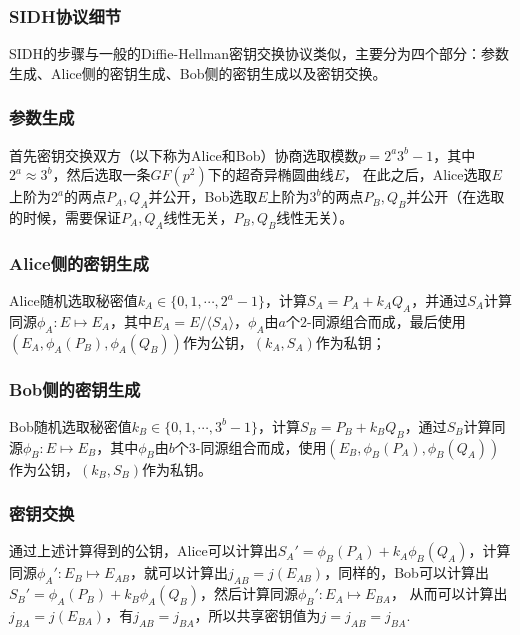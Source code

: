 \documentclass{book}
\numberwithin{equation}{subsubsection}
\begin{document}
\subsubsection{SIDH协议细节}
SIDH的步骤与一般的Diffie-Hellman密钥交换协议类似，主要分为四个部分：参数生成、Alice侧的密钥生成、Bob侧的密钥生成以及密钥交换。
\subsubsection*{参数生成}
首先密钥交换双方（以下称为Alice和Bob）协商选取模数$p=2^a3^b-1$，其中$2^a\approx 3^b$，然后选取一条$GF(p^2)$下的超奇异椭圆曲线$E$，
在此之后，Alice选取$E$上阶为$2^a$的两点$P_A,Q_A$并公开，Bob选取$E$上阶为$3^b$的两点$P_B,Q_B$并公开（在选取的时候，需要保证$P_A,Q_A$线性无关，$P_B,Q_B$线性无关）。\par
\subsubsection*{Alice侧的密钥生成}
Alice随机选取秘密值$k_A\in\{0,1,\cdots,2^a-1\}$，计算$S_A=P_A+k_AQ_A$，并通过$S_A$计算同源$\phi_A:E\mapsto E_A$，其中$E_A=E/\langle S_A\rangle$，$\phi_A$由$a$个$2$-同源组合而成，最后使用$(E_A,\phi_A(P_B),\phi_A(Q_B))$作为公钥，$(k_A,S_A)$作为私钥；
\subsubsection*{Bob侧的密钥生成}
Bob随机选取秘密值$k_B\in\{0,1,\cdots,3^b-1\}$，计算$S_B=P_B+k_BQ_B$，通过$S_B$计算同源$\phi_B:E\mapsto E_B$，其中$\phi_B$由$b$个$3$-同源组合而成，使用$(E_B,\phi_B(P_A),\phi_B(Q_A))$作为公钥，$(k_B,S_B)$作为私钥。
\subsubsection*{密钥交换}
通过上述计算得到的公钥，Alice可以计算出$S_{A}'=\phi_B(P_A)+k_A\phi_B(Q_A)$，计算同源$\phi_A':E_B\mapsto E_{AB}$，就可以计算出$j_{AB}=j(E_{AB})$，同样的，Bob可以计算出$S_{B}'=\phi_A(P_B)+k_B\phi_A(Q_B)$，然后计算同源$\phi_B':E_A\mapsto E_{BA}$，
从而可以计算出$j_{BA}=j(E_{BA})$，有$j_{AB}=j_{BA}$，所以共享密钥值为$j=j_{AB}=j_{BA}$.
\end{document}
